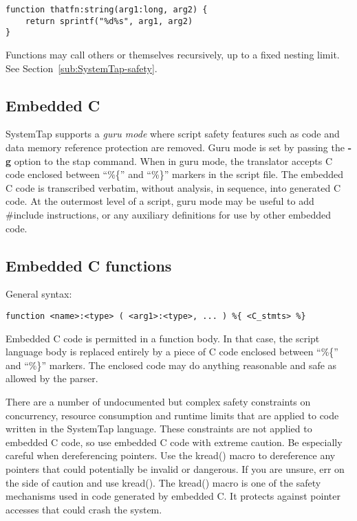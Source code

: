 \documentclass[twoside,english]{article}
\newenvironment{vindent}
{\begin{list}{}{\setlength{\listparindent}{6pt}}
\item[]}
{\end{list}}
\begin{document}
\begin{vindent}
\begin{verbatim}
function thatfn:string(arg1:long, arg2) {
    return sprintf("%d%s", arg1, arg2)
}
\end{verbatim}
\end{vindent}

Functions may call others or themselves recursively, up to a fixed nesting
limit. See Section~\ref{sub:SystemTap-safety}.


\subsection{Embedded C\label{sub:Embedded-C}}
SystemTap supports a \emph{guru mode} where script safety
features such as code and data memory reference protection are removed. Guru
mode is set by passing the \textbf{-g} option to the stap command. When in guru
mode, the translator accepts C code enclosed between {}``\%\{''
and {}``\%\}'' markers in the script file. The embedded C code is transcribed
verbatim, without analysis, in sequence, into generated C code. At the outermost
level of a script, guru mode may be useful to add \#include instructions,
or any auxiliary definitions for use by other embedded code.


\subsection{Embedded C functions}

General syntax:

\begin{vindent}
\begin{verbatim}
function <name>:<type> ( <arg1>:<type>, ... ) %{ <C_stmts> %}
\end{verbatim}
\end{vindent}
Embedded C code is permitted in a function body.
In that case, the script language
body is replaced entirely by a piece of C code enclosed between 
{}``\%\{'' and {}``\%\}'' markers.
The enclosed code may do anything reasonable and safe as allowed
by the parser.

There are a number of undocumented but complex safety constraints on concurrency,
resource consumption and runtime limits that are applied to code written
in the SystemTap language. These constraints are not applied to embedded
C code, so use embedded C code with extreme caution. Be especially
careful when dereferencing pointers. Use the kread() macro to dereference
any pointers that could potentially be invalid or dangerous. If you are unsure,
err on the side of caution and use kread(). The kread() macro is one of the
safety mechanisms used in code generated by embedded C. It protects against
pointer accesses that could crash the system.
\end{document}
